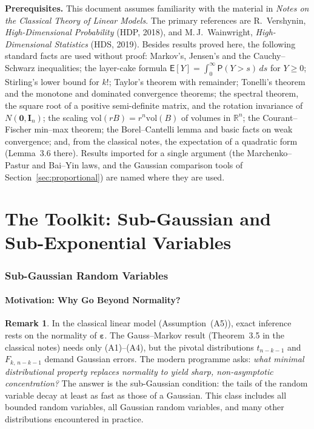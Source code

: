 \documentclass[12pt,a4paper]{article}
\theoremstyle{definition}
\newtheorem{remark}[theorem]{Remark}
\newcommand\expc{\mathsf{E}}
\newcommand\prb{\mathsf{P}}
\newcommand{\be}{\boldsymbol{\varepsilon}}
\newcommand{\bI}{\mathbf{I}}
\newcommand{\bzero}{\mathbf{0}}
\newcommand{\Real}{\mathbb{R}}
\begin{document}
\bigskip\noindent\textbf{Prerequisites.}\; This document assumes familiarity with the material in \emph{Notes on the Classical Theory of Linear Models}. The primary references are R.\ Vershynin, \emph{High-Dimensional Probability} (HDP, 2018), and M.\,J.\ Wainwright, \emph{High-Dimensional Statistics} (HDS, 2019). Besides results proved here, the following standard facts are used without proof: Markov's, Jensen's and the Cauchy--Schwarz inequalities; the layer-cake formula $\expc[Y] = \int_0^\infty \prb(Y > s)\,ds$ for $Y \geqslant 0$; Stirling's lower bound for $k!$; Taylor's theorem with remainder; Tonelli's theorem and the monotone and dominated convergence theorems; the spectral theorem, the square root of a positive semi-definite matrix, and the rotation invariance of $N(\bzero, \bI_n)$; the scaling $\mathrm{vol}(rB) = r^n\mathrm{vol}(B)$ of volumes in $\Real^n$; the Courant--Fischer min--max theorem; the Borel--Cantelli lemma and basic facts on weak convergence; and, from the classical notes, the expectation of a quadratic form (Lemma~3.6 there). Results imported for a single argument (the Marchenko--Pastur and Bai--Yin laws, and the Gaussian comparison tools of Section~\ref{sec:proportional}) are named where they are used.

\part{The Toolkit: Sub-Gaussian and Sub-Exponential Variables}\label{part:toolkit}

\section{Sub-Gaussian Random Variables}\label{sec:subgaussian}

\subsection{Motivation: Why Go Beyond Normality?}

\begin{remark}
In the classical linear model (Assumption~(A5)), exact inference rests on the normality of $\be$. The Gauss--Markov result (Theorem~3.5 in the classical notes) needs only (A1)--(A4), but the pivotal distributions $t_{n-k-1}$ and $F_{k,\,n-k-1}$ demand Gaussian errors. The modern programme asks: \emph{what minimal distributional property replaces normality to yield sharp, non-asymptotic concentration?} The answer is the sub-Gaussian condition: the tails of the random variable decay at least as fast as those of a Gaussian. This class includes all bounded random variables, all Gaussian random variables, and many other distributions encountered in practice.
\end{remark}
\end{document}

